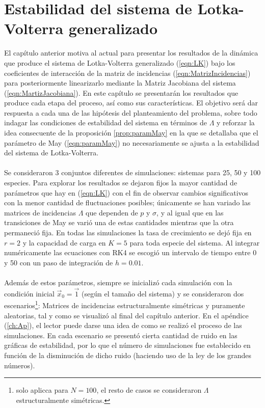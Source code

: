 \chapter{Estabilidad del sistema de Lotka-Volterra generalizado}

\setlength{\parindent}{0cm} El capítulo anterior motiva al actual para presentar los resultados de la dinámica que produce el sistema de Lotka-Volterra generalizado (\ref{eqn:LK}) bajo los coeficientes de interacción de la matriz de incidencias (\ref{eqn:MatrizIncidencias}) para posteriormente linearizarlo mediante la Matriz Jacobiana del sistema (\ref{eqn:MartizJacobiana}). En este capítulo se presentarán los resultados que produce cada etapa del proceso, así como sus características. El objetivo será dar respuesta a cada una de las hipótesis del planteamiento del problema, sobre todo indagar las condiciones de estabilidad del sistema en términos de $\Lambda$ y reforzar la idea consecuente de la proposición \ref{prop:paramMay} en la que se detallaba que el parámetro de May (\ref{eqn:paramMay}) no necesariamente se ajusta a la estabilidad del sistema de Lotka-Volterra.\\
\\
Se consideraron 3 conjuntos diferentes de simulaciones: sistemas para 25, 50 y 100 especies. Para explorar los resultados se dejaron fijos la mayor cantidad de parámetros que hay en (\ref{eqn:LK}) con el fin de observar cambios significativos con la menor cantidad de fluctuaciones posibles; únicamente se han variado las matrices de incidencias $\Lambda$ que dependen de $p$ y $\sigma$, y al igual que en las transiciones de May se varió una de estas cantidades mientras que la otra permaneció fija. En todas las simulaciones la tasa de crecimiento se dejó fija en $r=2$ y la capacidad de carga en $K=5$ para toda especie del sistema. Al integrar numéricamente las ecuaciones con RK4 se escogió un intervalo de tiempo entre 0 y 50 con un paso de integración de $h=0.01$.\\
\\
Además de estos parámetros, siempre se inicializó cada simulación con la condición inicial $\vec{x}_0=\vec{1}$ (según el tamaño del sistema) y se consideraron dos escenarios\footnote{solo aplicca para $N=100$, el resto de casos se consideraron $\Lambda$ estructuralmente simétricas.}: Matrices de incidencias estructuralmente simétricas y puramente aleatorias, tal y como se visualizó al final del capítulo anterior. En el apéndice (\ref{ch:Ap}), el lector puede darse una idea de como se realizó el proceso de las simulaciones. En cada escenario se presentó cierta cantidad de ruido en las gráficas de estabilidad, por lo que el número de simulaciones fue establecido en función de la disminución de dicho ruido (haciendo uso de la ley de los grandes números).

